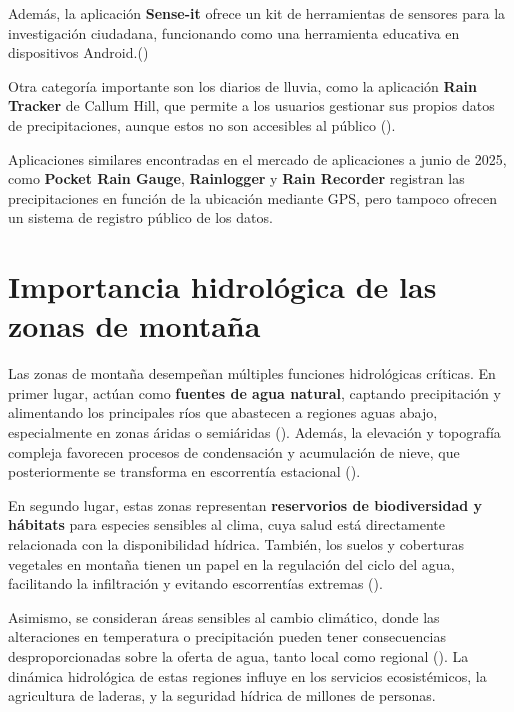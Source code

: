 Además, la aplicación \textbf{Sense-it} ofrece un kit de herramientas de sensores para la investigación ciudadana, funcionando como una herramienta educativa en dispositivos Android.(\cite{van2017senseit})


Otra categoría importante son los diarios de lluvia, como la aplicación \textbf{Rain Tracker} de Callum Hill, que permite a los usuarios gestionar sus propios datos de precipitaciones, aunque estos no son accesibles al público  (\cite{hill2021raintracker}).

Aplicaciones similares encontradas en el mercado de aplicaciones a junio de 2025, como \textbf{Pocket Rain Gauge}, \textbf{Rainlogger} y \textbf{Rain Recorder} registran las precipitaciones en función de la ubicación mediante GPS, pero tampoco ofrecen un sistema de registro público de los datos.








\section{Importancia hidrológica de las zonas de montaña}



Las zonas de montaña desempeñan múltiples funciones hidrológicas críticas. En primer lugar, actúan como \textbf{fuentes de agua natural}, captando precipitación y alimentando los principales ríos que abastecen a regiones aguas abajo, especialmente en zonas áridas o semiáridas  (\cite{viviroli2007mountain}). Además, la elevación y topografía compleja favorecen procesos de condensación y acumulación de nieve, que posteriormente se transforma en escorrentía estacional  (\cite{immerzeel2020importance}). 

En segundo lugar, estas zonas representan \textbf{reservorios de biodiversidad y hábitats} para especies sensibles al clima, cuya salud está directamente relacionada con la disponibilidad hídrica. También, los suelos y coberturas vegetales en montaña tienen un papel en la regulación del ciclo del agua, facilitando la infiltración y evitando escorrentías extremas  (\cite{buytaert2011mountain}).

Asimismo, se consideran áreas sensibles al cambio climático, donde las alteraciones en temperatura o precipitación pueden tener consecuencias desproporcionadas sobre la oferta de agua, tanto local como regional  (\cite{beniston2003climatic}). La dinámica hidrológica de estas regiones influye en los servicios ecosistémicos, la agricultura de laderas, y la seguridad hídrica de millones de personas.

